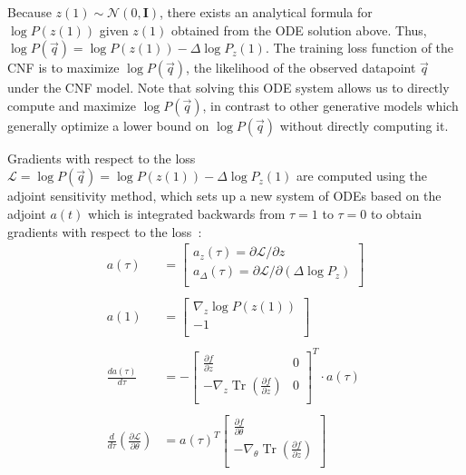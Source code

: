 \documentclass[a4paper,11pt]{article}
\begin{document}
Because $z(1) \sim \mathcal{N}(0, \mathbf{I})$, there exists an analytical formula for $\log{P(z(1))}$ given $z(1)$ obtained from the ODE solution above. Thus, $\log{P(\vec{q})} = \log{P(z(1))} - \Delta\log{P_z}(1)$. The training loss function of the CNF is to maximize $\log{P(\vec{q})}$, the likelihood of the observed datapoint $\vec{q}$ under the CNF model. Note that solving this ODE system allows us to directly compute and maximize $\log{P(\vec{q})}$, in contrast to other generative models which generally optimize a lower bound on $\log{P(\vec{q})}$ without directly computing it.
\

Gradients with respect to the loss $\mathcal{L} = \log{P(\vec{q})} =  \log{P(z(1))} - \Delta\log{P_z}(1)$ are computed using the adjoint sensitivity method, which sets up a new system of ODEs based on the adjoint $a(t)$ which is integrated backwards from $\tau=1$ to $\tau=0$ to obtain gradients with respect to the loss~\cite{Pontryagin1961a}:
\begin{align*}
    a(\tau) &= 
    \begin{bmatrix}
    a_z(\tau) = \partial\mathcal{L}/\partial z\\
    a_{\Delta}(\tau) = \partial\mathcal{L}/\partial (\Delta\log{P_z})\\
    \end{bmatrix}\\\\
    a(1) &= 
    \begin{bmatrix}
    \nabla_z \log{P(z(1))}\\
    -1\\
    \end{bmatrix} \\\\
    \frac{da(\tau)}{d\tau} &= -
    \begin{bmatrix}
    \frac{\partial f}{\partial z} & 0\\
    -\nabla_z \operatorname{Tr}\left(\frac{\partial f}{\partial z}\right) & 0\\
    \end{bmatrix}^T \cdot
    a(\tau) \\\\
    \frac{d}{d\tau}\left(\frac{\partial \mathcal{L}}{\partial \theta}\right) &= a(\tau)^T 
    \begin{bmatrix}
        \frac{\partial f}{\partial \theta} \\
    -\nabla_{\theta} \operatorname{Tr}\left(\frac{\partial f}{\partial z}\right)\\
    \end{bmatrix} 
\end{align*}
\end{document}
